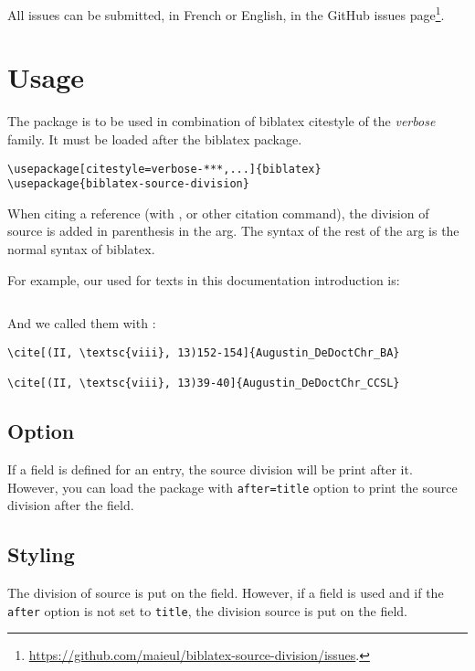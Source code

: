 \documentclass{ltxdockit}[2011/03/25]
\newcommand{\biblatex}{biblatex\xspace}
\begin{document}
All issues can be submitted, in French or English, in the GitHub issues page\footnote{\url{https://github.com/maieul/biblatex-source-division/issues}.}.

\section{Usage}

The package is to be used in combination of \biblatex citestyle of the \emph{verbose} family.
It must be loaded after the \biblatex package.
\begin{verbatim}
\usepackage[citestyle=verbose-***,...]{biblatex}
\usepackage{biblatex-source-division}
\end{verbatim}

When citing a reference (with ,  or other citation command),  the division of source is added in parenthesis in the  arg. The syntax of the rest of the  arg is the normal syntax of \biblatex.

For example, our  used for texts in this documentation introduction is:

\inputminted{tex}{biblatex-source-division.bib}

And we called them with :

\begin{verbatim}
\cite[(II, \textsc{viii}, 13)152-154]{Augustin_DeDoctChr_BA}

\cite[(II, \textsc{viii}, 13)39-40]{Augustin_DeDoctChr_CCSL}
\end{verbatim}

\subsection{Option}

If a  field is defined for an entry, the source division will be print after it. However, you can load the package with \verb+after=title+ option to print the source division after the  field.

\subsection{Styling}

The division of source is put on the  field. 
However, if a  field is used and if the \verb+after+ option is not set to \verb+title+, the division source is put on the  field.
\end{document}
